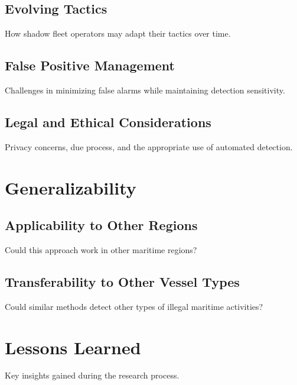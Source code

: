 \subsection{Evolving Tactics}
How shadow fleet operators may adapt their tactics over time.

\subsection{False Positive Management}
Challenges in minimizing false alarms while maintaining detection sensitivity.

\subsection{Legal and Ethical Considerations}
Privacy concerns, due process, and the appropriate use of automated detection.

\section{Generalizability}
\subsection{Applicability to Other Regions}
Could this approach work in other maritime regions?

\subsection{Transferability to Other Vessel Types}
Could similar methods detect other types of illegal maritime activities?

\section{Lessons Learned}
Key insights gained during the research process.

